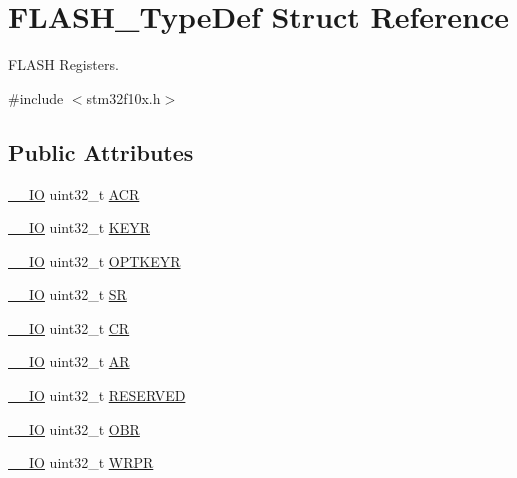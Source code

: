 \hypertarget{struct_f_l_a_s_h___type_def}{}\section{F\+L\+A\+S\+H\+\_\+\+Type\+Def Struct Reference}
\label{struct_f_l_a_s_h___type_def}


F\+L\+A\+SH Registers.  




{\ttfamily \#include $<$stm32f10x.\+h$>$}

\subsection*{Public Attributes}
\begin{DoxyCompactItemize}
\item 
\hyperlink{core__sc300_8h_aec43007d9998a0a0e01faede4133d6be}{\+\_\+\+\_\+\+IO} uint32\+\_\+t \hyperlink{struct_f_l_a_s_h___type_def_aaf432a8a8948613f4f66fcace5d2e5fe}{A\+CR}
\item 
\hyperlink{core__sc300_8h_aec43007d9998a0a0e01faede4133d6be}{\+\_\+\+\_\+\+IO} uint32\+\_\+t \hyperlink{struct_f_l_a_s_h___type_def_a802e9a26a89b44decd2d32d97f729dd3}{K\+E\+YR}
\item 
\hyperlink{core__sc300_8h_aec43007d9998a0a0e01faede4133d6be}{\+\_\+\+\_\+\+IO} uint32\+\_\+t \hyperlink{struct_f_l_a_s_h___type_def_a793cd13a4636c9785fdb99316f7fd7ab}{O\+P\+T\+K\+E\+YR}
\item 
\hyperlink{core__sc300_8h_aec43007d9998a0a0e01faede4133d6be}{\+\_\+\+\_\+\+IO} uint32\+\_\+t \hyperlink{struct_f_l_a_s_h___type_def_a52c4943c64904227a559bf6f14ce4de6}{SR}
\item 
\hyperlink{core__sc300_8h_aec43007d9998a0a0e01faede4133d6be}{\+\_\+\+\_\+\+IO} uint32\+\_\+t \hyperlink{struct_f_l_a_s_h___type_def_a7919306d0e032a855200420a57f884d7}{CR}
\item 
\hyperlink{core__sc300_8h_aec43007d9998a0a0e01faede4133d6be}{\+\_\+\+\_\+\+IO} uint32\+\_\+t \hyperlink{struct_f_l_a_s_h___type_def_a9cd77bc29038841798b4b63c5cecdb9d}{AR}
\item 
\hyperlink{core__sc300_8h_aec43007d9998a0a0e01faede4133d6be}{\+\_\+\+\_\+\+IO} uint32\+\_\+t \hyperlink{struct_f_l_a_s_h___type_def_a32e5cc660e711dc5424f827e2d4efd88}{R\+E\+S\+E\+R\+V\+ED}
\item 
\hyperlink{core__sc300_8h_aec43007d9998a0a0e01faede4133d6be}{\+\_\+\+\_\+\+IO} uint32\+\_\+t \hyperlink{struct_f_l_a_s_h___type_def_a24dece1e3b3185456afe34c3dc6add2e}{O\+BR}
\item 
\hyperlink{core__sc300_8h_aec43007d9998a0a0e01faede4133d6be}{\+\_\+\+\_\+\+IO} uint32\+\_\+t \hyperlink{struct_f_l_a_s_h___type_def_ac1889c0e17d868ab991f267ceb9dbb4b}{W\+R\+PR}
\end{DoxyCompactItemize}


